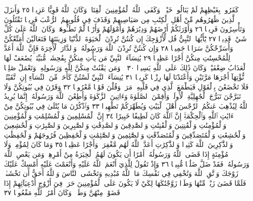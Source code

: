 كَفَرُوا۟ بِغَيْظِهِمْ لَمْ يَنَالُوا۟ خَيْرࣰاۚ وَكَفَى ٱللَّهُ ٱلْمُؤْمِنِينَ
ٱلْقِتَالَۚ وَكَانَ ٱللَّهُ قَوِيًّا عَزِيزࣰا ٢٥ وَأَنزَلَ ٱلَّذِينَ ظَٰهَرُوهُم مِّنْ
أَهْلِ ٱلْكِتَٰبِ مِن صَيَاصِيهِمْ وَقَذَفَ فِي قُلُوبِهِمُ ٱلرُّعْبَ
فَرِيقࣰا تَقْتُلُونَ وَتَأْسِرُونَ فَرِيقࣰا ٢٦ وَأَوْرَثَكُمْ أَرْضَهُمْ
وَدِيَٰرَهُمْ وَأَمْوَٰلَهُمْ وَأَرْضࣰا لَّمْ تَطَـُٔوهَاۚ وَكَانَ ٱللَّهُ عَلَىٰ كُلِّ
شَيْءࣲ قَدِيرࣰا ٢٧ يَٰٓأَيُّهَا ٱلنَّبِيُّ قُل لِّأَزْوَٰجِكَ إِن كُنتُنَّ تُرِدْنَ
ٱلْحَيَوٰةَ ٱلدُّنْيَا وَزِينَتَهَا فَتَعَالَيْنَ أُمَتِّعْكُنَّ وَأُسَرِّحْكُنَّ
سَرَاحࣰا جَمِيلࣰا ٢٨ وَإِن كُنتُنَّ تُرِدْنَ ٱللَّهَ وَرَسُولَهُۥ وَٱلدَّارَ
ٱلْأٓخِرَةَ فَإِنَّ ٱللَّهَ أَعَدَّ لِلْمُحْسِنَٰتِ مِنكُنَّ أَجْرًا عَظِيمࣰا ٢٩
يَٰنِسَآءَ ٱلنَّبِيِّ مَن يَأْتِ مِنكُنَّ بِفَٰحِشَةࣲ مُّبَيِّنَةࣲ يُضَٰعَفْ
لَهَا ٱلْعَذَابُ ضِعْفَيْنِۚ وَكَانَ ذَٰلِكَ عَلَى ٱللَّهِ يَسِيرࣰا ٣٠
۞ وَمَن يَقْنُتْ مِنكُنَّ لِلَّهِ وَرَسُولِهِۦ وَتَعْمَلْ صَٰلِحࣰا نُّؤْتِهَآ
أَجْرَهَا مَرَّتَيْنِ وَأَعْتَدْنَا لَهَا رِزْقࣰا كَرِيمࣰا ٣١ يَٰنِسَآءَ ٱلنَّبِيِّ
لَسْتُنَّ كَأَحَدࣲ مِّنَ ٱلنِّسَآءِ إِنِ ٱتَّقَيْتُنَّۚ فَلَا تَخْضَعْنَ بِٱلْقَوْلِ
فَيَطْمَعَ ٱلَّذِي فِي قَلْبِهِۦ مَرَضࣱ وَقُلْنَ قَوْلࣰا مَّعْرُوفࣰا ٣٢ وَقَرْنَ
فِي بُيُوتِكُنَّ وَلَا تَبَرَّجْنَ تَبَرُّجَ ٱلْجَٰهِلِيَّةِ ٱلْأُولَىٰۖ وَأَقِمْنَ
ٱلصَّلَوٰةَ وَءَاتِينَ ٱلزَّكَوٰةَ وَأَطِعْنَ ٱللَّهَ وَرَسُولَهُۥٓۚ إِنَّمَا
يُرِيدُ ٱللَّهُ لِيُذْهِبَ عَنكُمُ ٱلرِّجْسَ أَهْلَ ٱلْبَيْتِ وَيُطَهِّرَكُمْ
تَطْهِيرࣰا ٣٣ وَٱذْكُرْنَ مَا يُتْلَىٰ فِي بُيُوتِكُنَّ مِنْ
ءَايَٰتِ ٱللَّهِ وَٱلْحِكْمَةِۚ إِنَّ ٱللَّهَ كَانَ لَطِيفًا خَبِيرًا ٣٤
إِنَّ ٱلْمُسْلِمِينَ وَٱلْمُسْلِمَٰتِ وَٱلْمُؤْمِنِينَ وَٱلْمُؤْمِنَٰتِ
وَٱلْقَٰنِتِينَ وَٱلْقَٰنِتَٰتِ وَٱلصَّٰدِقِينَ وَٱلصَّٰدِقَٰتِ وَٱلصَّٰبِرِينَ
وَٱلصَّٰبِرَٰتِ وَٱلْخَٰشِعِينَ وَٱلْخَٰشِعَٰتِ وَٱلْمُتَصَدِّقِينَ
وَٱلْمُتَصَدِّقَٰتِ وَٱلصَّٰٓئِمِينَ وَٱلصَّٰٓئِمَٰتِ وَٱلْحَٰفِظِينَ
فُرُوجَهُمْ وَٱلْحَٰفِظَٰتِ وَٱلذَّٰكِرِينَ ٱللَّهَ كَثِيرࣰا
وَٱلذَّٰكِرَٰتِ أَعَدَّ ٱللَّهُ لَهُم مَّغْفِرَةࣰ وَأَجْرًا عَظِيمࣰا ٣٥
وَمَا كَانَ لِمُؤْمِنࣲ وَلَا مُؤْمِنَةٍ إِذَا قَضَى ٱللَّهُ وَرَسُولُهُۥٓ أَمْرًا أَن يَكُونَ
لَهُمُ ٱلْخِيَرَةُ مِنْ أَمْرِهِمْۗ وَمَن يَعْصِ ٱللَّهَ وَرَسُولَهُۥ فَقَدْ ضَلَّ ضَلَٰلࣰا
مُّبِينࣰا ٣٦ وَإِذْ تَقُولُ لِلَّذِيٓ أَنْعَمَ ٱللَّهُ عَلَيْهِ وَأَنْعَمْتَ عَلَيْهِ
أَمْسِكْ عَلَيْكَ زَوْجَكَ وَٱتَّقِ ٱللَّهَ وَتُخْفِي فِي نَفْسِكَ مَا ٱللَّهُ
مُبْدِيهِ وَتَخْشَى ٱلنَّاسَ وَٱللَّهُ أَحَقُّ أَن تَخْشَىٰهُۖ فَلَمَّا قَضَىٰ زَيْدࣱ
مِّنْهَا وَطَرࣰا زَوَّجْنَٰكَهَا لِكَيْ لَا يَكُونَ عَلَى ٱلْمُؤْمِنِينَ حَرَجࣱ فِيٓ
أَزْوَٰجِ أَدْعِيَآئِهِمْ إِذَا قَضَوْا۟ مِنْهُنَّ وَطَرࣰاۚ وَكَانَ أَمْرُ ٱللَّهِ مَفْعُولࣰا ٣٧
